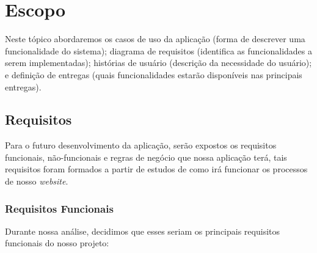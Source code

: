 \section{Escopo}

Neste tópico abordaremos os casos de uso da aplicação (forma de descrever uma
funcionalidade do sistema); diagrama de requisitos (identifica as funcionalidades a serem implementadas); histórias de usuário (descrição da necessidade do usuário); e definição de entregas (quais funcionalidades estarão disponíveis nas principais entregas).
\subsection{Requisitos}

Para o futuro desenvolvimento da aplicação, serão expostos os requisitos funcionais, não-funcionais e regras de negócio que nossa aplicação terá, tais requisitos foram formados a partir de estudos de como irá funcionar os processos de nosso \emph{website}.

\subsubsection{Requisitos Funcionais}

Durante nossa análise, decidimos que esses seriam os principais requisitos funcionais do nosso projeto:

